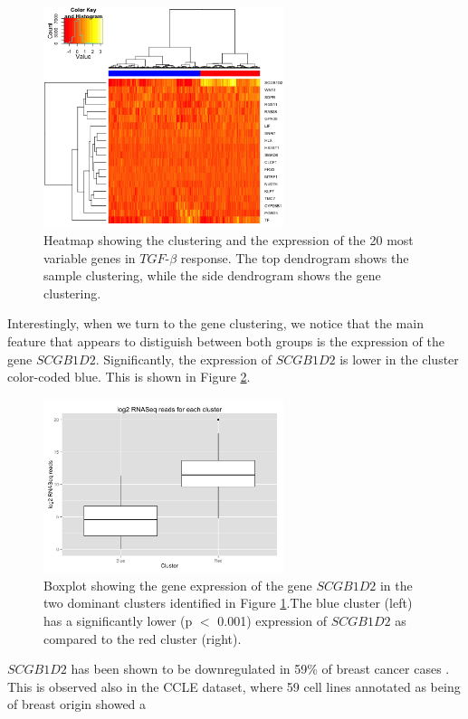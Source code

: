 \documentclass[a4paper,12pt]{article}
\begin{document}
\begin{figure}[t]
\centering
\includegraphics[width=7cm]{heatmap.png}
\caption[Heatmap showing clustering of the top 20 most variable genes]
{Heatmap showing the clustering and the expression of the 20 most
  variable genes in $\textit{TGF}$-$\beta$ response. The top dendrogram
shows the sample clustering, while the side dendrogram shows the
gene clustering.}
\label{heatmap}
\end{figure}
Interestingly, when we turn to the gene clustering, we
notice that the main feature that appears to distiguish between both
groups is the expression of the gene
$\textit{SCGB1D2}$. Significantly, the expression of
$\textit{SCGB1D2}$ is lower in the cluster color-coded blue. This is
shown in Figure \ref{scgb1d2}.
\begin{figure}[h]
\centering
\includegraphics[width=7cm]{rnaseqscgb1d2.png}
\caption[Boxplots of $\textit{SCGB1D2}$ between dominant clusters in
TCGA data]{Boxplot showing the gene expression of the gene
  $\textit{SCGB1D2}$ in the two dominant clusters identified in Figure
\ref{heatmap}.The blue cluster (left) has a significantly lower (p $<$
0.001) expression of  $\textit{SCGB1D2}$ as compared to the red
cluster (right).}
\label{scgb1d2}
\end{figure}
$\textit{SCGB1D2}$ has been shown to be downregulated in 59\% of
breast cancer cases \cite{Zafrakas2006}. This is observed also in
the CCLE dataset, where 59 cell lines annotated as being of breast origin showed a
\end{document}
